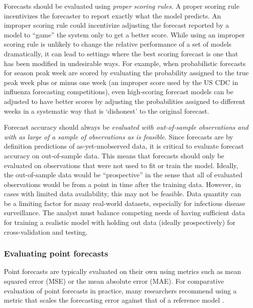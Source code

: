 \documentclass[a4paper]{article}
\begin{document}
Forecasts should be evaluated using \textit{proper scoring rules}.\cite{Gneiting2007}
A proper scoring rule incentivizes the forecaster to report exactly what the model predicts.
An improper scoring rule could incentivize adjusting the forecast reported by a model to ``game'' the system only to get a better score.
While using an improper scoring rule is unlikely to change the relative performance of a set of models dramatically, it can lead to settings where the best scoring forecast is one that has been modified in undesirable ways.
For example, when probabilistic forecasts for season peak week are scored by evaluating the probability assigned to the true peak week plus or minus one week (an improper score used by the US CDC in influenza forecasting competitions\cite{mcgowan2019collaborative,reich2019collaborative}), even high-scoring forecast models can be adjusted to have better scores by adjusting the probabilities assigned to different weeks in a systematic way that is `dishonest' to the original forecast.\cite{bracher2019}

Forecast accuracy should always be \textit{evaluated with out-of-sample observations and with as large of a sample of observations as is feasible}.
Since forecasts are by definition predictions of as-yet-unobserved data, it is critical to evaluate forecast accuracy on out-of-sample data.
This means that forecasts should only be evaluated on observations that were not used to fit or train the model.
Ideally, the out-of-sample data would be ``prospective'' in the sense that all of evaluated observations would be from a point in time after the training data.
However, in cases with limited data availability, this may not be feasible.
Data quantity can be a limiting factor for many real-world datasets, especially for infectious disease surveillance. 
The analyst must balance competing needs of having sufficient data for training a realistic model with holding out data (ideally prospectively) for cross-validation and testing.

\subsubsection{Evaluating point forecasts}

Point forecasts are typically evaluated on their own using metrics such as mean squared error (MSE) or the mean absolute error (MAE).
For comparative evaluation of point forecasts in practice, many researchers recommend using a metric that scales the forecasting error against that of a reference model \cite{Hyndman2006, Reich2016, Gneiting2007}.
\end{document}
